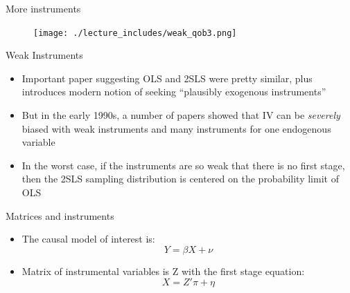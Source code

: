 \documentclass{beamer}
\begin{document}
	






	



\begin{frame}{More instruments}

	\begin{figure}
	\texttt{[image: ./lecture\_includes/weak\_qob3.png]}
	\end{figure}
	

\end{frame}


\begin{frame}{Weak Instruments}
	
	\begin{itemize}
	\item Important paper suggesting OLS and 2SLS were pretty similar, plus introduces modern notion of seeking ``plausibly exogenous instruments''
	\item But in the early 1990s, a number of papers showed that IV can be \emph{severely} biased with weak instruments and many instruments for one endogenous variable
	\item In the worst case, if the instruments are so weak that there is no first stage, then the 2SLS sampling distribution is centered on the probability limit of OLS
	\end{itemize}
\end{frame}



\begin{frame}{Matrices and instruments}

\begin{itemize}
	\item The causal model of interest is: $$Y=\beta X + \nu$$
	\item Matrix of instrumental variables is Z with the first stage equation:$$X = {Z'}\pi + \eta$$
\end{itemize}

\end{frame}
\end{document}
